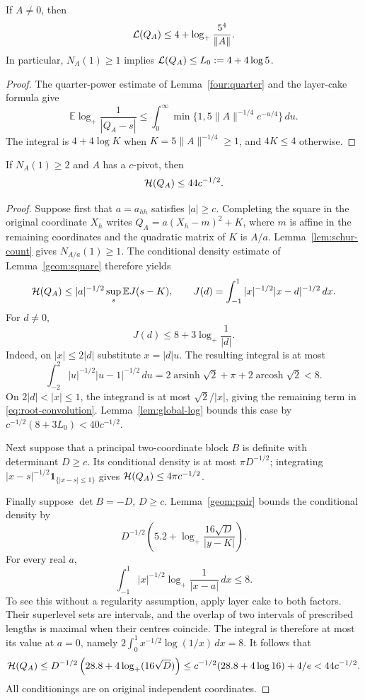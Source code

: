 \begin{lemma}
\label{lem:global-log}
If \(A\ne0\), then
\[
 {\cal L}(Q_A)\leq
 4+\log_+\frac{5^4}{\|A\|}.
\]
In particular, \(N_A(1)\geq1\) implies
\({\cal L}(Q_A)\leq L_0:=4+4\log5\).
\end{lemma}
\begin{proof}
The quarter-power estimate of Lemma~\ref{four:quarter} and the
layer-cake formula give
\[
 \mathbb E\log_+\frac1{|Q_A-s|}
 \leq\int_0^\infty
 \min\{1,5\|A\|^{-1/4}e^{-u/4}\}\,du.
\]
The integral is \(4+4\log K\) when \(K=5\|A\|^{-1/4}\geq1\),
and \(4K\leq4\) otherwise.
\end{proof}

\begin{lemma}
\label{lem:pivot-half}
If \(N_A(1)\geq2\) and \(A\) has a \(c\)-pivot, then
\[
 {\cal H}(Q_A)\leq44c^{-1/2}.
\]
\end{lemma}
\begin{proof}
Suppose first that \(a=a_{hh}\) satisfies \(|a|\geq c\).
Completing the square in the original coordinate \(X_h\) writes
\(Q_A=a(X_h-m)^2+K\), where \(m\) is affine in the remaining
coordinates and the quadratic matrix of \(K\) is \(A/a\).
Lemma~\ref{lem:schur-count} gives \(N_{A/a}(1)\geq1\).
The conditional density estimate of Lemma~\ref{geom:square}
therefore yields
\[
 {\cal H}(Q_A)
 \leq |a|^{-1/2}\sup_s\mathbb E J(s-K),
 \qquad
 J(d)=\int_{-1}^1 |x|^{-1/2}|x-d|^{-1/2}\,dx .
\]
For \(d\ne0\),
\begin{equation}
 J(d)\leq8+3\log_+\frac1{|d|}.
 \label{eq:root-convolution}
\end{equation}
Indeed, on \(|x|\leq2|d|\) substitute \(x=|d|u\).
The resulting integral is at most
\[
 \int_{-2}^2 |u|^{-1/2}|u-1|^{-1/2}\,du
 =2\operatorname{arsinh}\sqrt2+\pi
   +2\operatorname{arcosh}\sqrt2<8.
\]
On \(2|d|<|x|\leq1\), the integrand is at most
\(\sqrt2/|x|\), giving the remaining term in
\eqref{eq:root-convolution}.  Lemma~\ref{lem:global-log}
bounds this case by \(c^{-1/2}(8+3L_0)<40c^{-1/2}\).

Next suppose that a principal two-coordinate block \(B\) is
definite with determinant \(D\geq c\).  Its conditional density
is at most \(\pi D^{-1/2}\); integrating
\(|x-s|^{-1/2}\boldsymbol1_{\{|x-s|\leq1\}}\) gives
\({\cal H}(Q_A)\leq4\pi c^{-1/2}\).

Finally suppose \(\det B=-D\), \(D\geq c\).
Lemma~\ref{geom:pair} bounds the conditional density by
\[
 D^{-1/2}\left(5.2+
       \log_+\frac{16\sqrt D}{|y-K|}\right).
\]
For every real \(a\),
\[
 \int_{-1}^1 |x|^{-1/2}\log_+\frac1{|x-a|}\,dx\leq8.
\]
To see this without a regularity assumption, apply layer cake
to both factors.  Their superlevel sets are intervals, and the
overlap of two intervals of prescribed lengths is maximal when
their centres coincide.  The integral is therefore at most its
value at \(a=0\), namely
\(2\int_0^1x^{-1/2}\log(1/x)\,dx=8\).
It follows that
\[
 {\cal H}(Q_A)\leq
 D^{-1/2}\left(28.8+4\log_+(16\sqrt D)\right)
 \leq c^{-1/2}(28.8+4\log16)+4/e
 <44c^{-1/2}.
\]
All conditionings are on original independent coordinates.
\end{proof}

